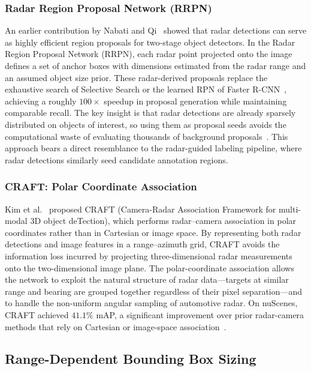 \subsubsection{Radar Region Proposal Network (RRPN)}

An earlier contribution by Nabati and Qi~\cite{nabati2019rrpn} showed that radar detections can serve as highly efficient region proposals for two-stage object detectors. In the Radar Region Proposal Network (RRPN), each radar point projected onto the image defines a set of anchor boxes with dimensions estimated from the radar range and an assumed object size prior. These radar-derived proposals replace the exhaustive search of Selective Search or the learned RPN of Faster R-CNN~\cite{ren2015faster}, achieving a roughly $100\times$ speedup in proposal generation while maintaining comparable recall. The key insight is that radar detections are already sparsely distributed on objects of interest, so using them as proposal seeds avoids the computational waste of evaluating thousands of background proposals~\cite{nabati2019rrpn}. This approach bears a direct resemblance to the radar-guided labeling pipeline, where radar detections similarly seed candidate annotation regions.

\subsubsection{CRAFT: Polar Coordinate Association}

Kim et al.~\cite{Kim2022CRAFT} proposed CRAFT (Camera-Radar Association Framework for multi-modal 3D object deTection), which performs radar--camera association in polar coordinates rather than in Cartesian or image space. By representing both radar detections and image features in a range--azimuth grid, CRAFT avoids the information loss incurred by projecting three-dimensional radar measurements onto the two-dimensional image plane. The polar-coordinate association allows the network to exploit the natural structure of radar data---targets at similar range and bearing are grouped together regardless of their pixel separation---and to handle the non-uniform angular sampling of automotive radar. On nuScenes, CRAFT achieved $41.1\%$ mAP, a significant improvement over prior radar-camera methods that rely on Cartesian or image-space association~\cite{Kim2022CRAFT}.

\subsection{Range-Dependent Bounding Box Sizing}\label{subsec:bbox_sizing}


